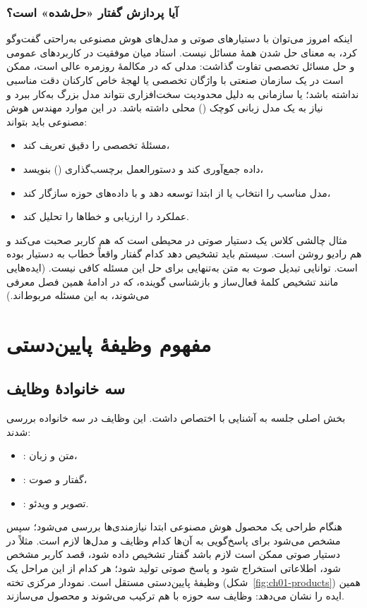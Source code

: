 \subsubsection{آیا پردازش گفتار «حل‌شده» است؟}
اینکه امروز می‌توان با دستیارهای صوتی و مدل‌های هوش مصنوعی به‌راحتی گفت‌وگو کرد، به معنای حل شدن همهٔ مسائل نیست. استاد میان موفقیت در کاربردهای عمومی و حل مسائل تخصصی تفاوت گذاشت: مدلی که در مکالمهٔ روزمره عالی است، ممکن است در یک سازمان صنعتی با واژگان تخصصی یا لهجهٔ خاص کارکنان دقت مناسبی نداشته باشد؛ یا سازمانی به دلیل محدودیت سخت‌افزاری نتواند مدل بزرگ به‌کار ببرد و نیاز به یک مدل زبانی کوچک () محلی داشته باشد. در این موارد مهندس هوش مصنوعی باید بتواند:
\begin{itemize}
  \item مسئلهٔ تخصصی را دقیق تعریف کند،
  \item داده جمع‌آوری کند و دستورالعمل برچسب‌گذاری () بنویسد،
  \item مدل مناسب را انتخاب یا از ابتدا توسعه دهد و با داده‌های حوزه سازگار کند،
  \item عملکرد را ارزیابی و خطاها را تحلیل کند.
\end{itemize}

\begin{assignmentbox}{مثال چالشی کلاس}
یک دستیار صوتی در محیطی است که هم کاربر صحبت می‌کند و هم رادیو روشن است. سیستم باید تشخیص دهد کدام گفتار واقعاً خطاب به دستیار بوده است. توانایی تبدیل صوت به متن به‌تنهایی برای حل این مسئله کافی نیست. (ایده‌هایی مانند تشخیص کلمهٔ فعال‌ساز و بازشناسی گوینده، که در ادامهٔ همین فصل معرفی می‌شوند، به این مسئله مربوط‌اند.)
\end{assignmentbox}

\section{مفهوم وظیفهٔ پایین‌دستی}
\subsection{سه خانوادهٔ وظایف}
بخش اصلی جلسه به آشنایی با  اختصاص داشت. این وظایف در سه خانواده بررسی شدند:
\begin{itemize}
  \item {}: متن و زبان،
  \item {}: گفتار و صوت،
  \item {}: تصویر و ویدئو.
\end{itemize}
هنگام طراحی یک محصول هوش مصنوعی ابتدا نیازمندی‌ها بررسی می‌شود؛ سپس مشخص می‌شود برای پاسخ‌گویی به آن‌ها کدام وظایف و مدل‌ها لازم است. مثلاً در دستیار صوتی ممکن است لازم باشد گفتار تشخیص داده شود، قصد کاربر مشخص شود، اطلاعاتی استخراج شود و پاسخ صوتی تولید شود؛ هر کدام از این مراحل یک وظیفهٔ پایین‌دستی مستقل است. نمودار مرکزی تخته (شکل~\ref{fig:ch01-products}) همین ایده را نشان می‌دهد: وظایف سه حوزه با هم ترکیب می‌شوند و محصول می‌سازند.

